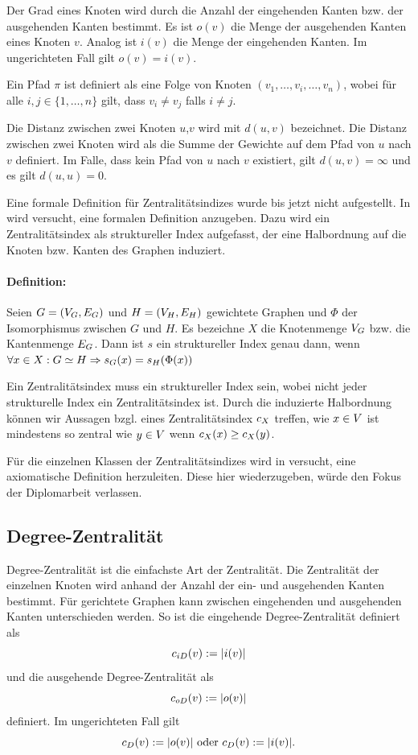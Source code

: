 Der Grad eines Knoten wird durch die Anzahl der eingehenden Kanten bzw. der ausgehenden Kanten bestimmt. Es ist $o(v)$ die Menge der ausgehenden Kanten eines Knoten $v$. Analog ist $i(v)$ die Menge der eingehenden Kanten. Im ungerichteten Fall gilt $o(v) = i(v)$. 

Ein Pfad $\pi$ ist definiert als eine Folge von Knoten $(v_1,\ldots,v_i,\ldots,v_n)$, wobei für alle $i,j \in \{1,\ldots,n\}$ gilt, dass $v_i \neq v_j$ falls $i \neq j$.

Die Distanz zwischen zwei Knoten $u$,$v$ wird mit $d(u,v)$ bezeichnet. Die Distanz zwischen zwei Knoten wird als die Summe der Gewichte auf dem Pfad von $u$ nach $v$ definiert. Im Falle, dass kein Pfad von $u$ nach $v$ existiert, gilt $d(u,v) = \infty$ und es gilt $d(u,u) = 0$. 

Eine formale Definition für Zentralitätsindizes wurde bis jetzt nicht aufgestellt. In \citet{Brandes2005} wird versucht, eine formalen Definition anzugeben. Dazu wird ein Zentralitätsindex als struktureller Index aufgefasst, der eine Halbordnung auf die Knoten bzw. Kanten des Graphen induziert. 

\paragraph{Definition:} Seien $G = (V_G,E_G)$ und $H=(V_H,E_H)$ gewichtete Graphen und $\Phi$ der Isomorphismus zwischen $G$ und $H$. Es bezeichne $X$ die Knotenmenge $V_G$ bzw. die Kantenmenge $E_G$. Dann ist $s$ ein struktureller Index genau dann, wenn $\forall x \in X: G \simeq H \Rightarrow s_G(x) = s_H(\Phi(x))$

Ein Zentralitätsindex muss ein struktureller Index sein, wobei nicht jeder strukturelle Index ein Zentralitätsindex ist. Durch die induzierte Halbordnung können wir Aussagen bzgl. eines Zentralitätsindex $c_{X}$ treffen, wie $x \in V$ ist mindestens so zentral wie $y \in V$ wenn $c_{X}(x) \geq c_{X}(y)$.

Für die einzelnen Klassen der Zentralitätsindizes wird in \citet{Brandes2005} versucht, eine axiomatische Definition herzuleiten. Diese hier wiederzugeben, würde den Fokus der Diplomarbeit verlassen. 

\subsection{Degree-Zentralität}
\label{subsec:degreecentrality}
Degree-Zentralität ist die einfachste Art der Zentralität. Die Zentralität der einzelnen Knoten wird anhand der Anzahl der ein- und ausgehenden Kanten bestimmt. 
Für gerichtete Graphen kann zwischen eingehenden und ausgehenden Kanten unterschieden werden. So ist die eingehende Degree-Zentralität definiert als \[c_{iD}(v) := |i(v)|\] 
und die ausgehende Degree-Zentralität als 
\[c_{oD}(v) := |o(v)|\] 
definiert. Im ungerichteten Fall gilt \[c_{D}(v) := |o(v)| \mbox{ oder } c_{D}(v) := |i(v)| \mbox{.}\]

